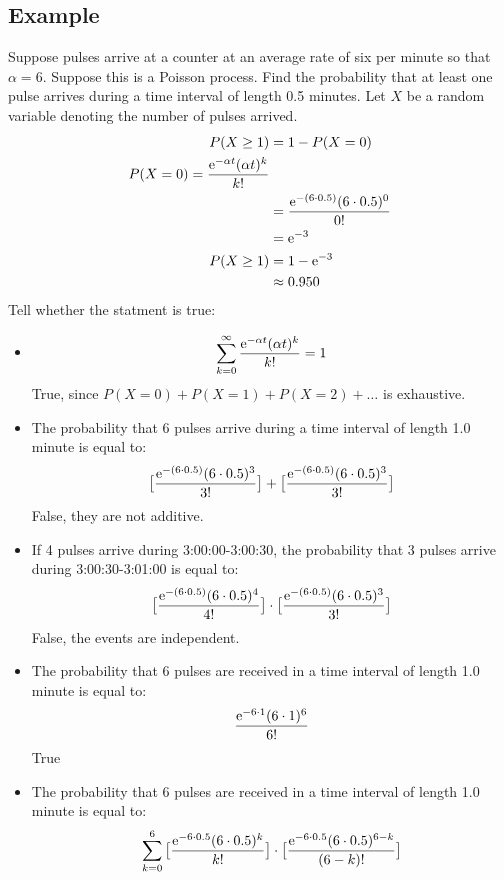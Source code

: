 \documentclass[letterpaper, 12pt]{math}
\begin{document}
\subsection*{Example}
Suppose pulses arrive at a counter at an average rate of six per minute so that
\( \alpha = 6 \). Suppose this is a Poisson process. Find the probability that
at least one pulse arrives during a time interval of length 0.5 minutes. Let
\( X \) be a random variable denoting the number of pulses arrived.
\begin{align*}
  P(X\geq 1) &= 1-P(X=0) \\
  P(X=0) = \frac{\mathrm{e}^{-\alpha t}(\alpha t)^{k}}{k!} \\
  &= \frac{\mathrm{e}^{-(6\cdot 0.5)}(6\cdot 0.5)^{0}}{0!} \\
  &= \mathrm{e}^{-3} \\
  P(X\geq 1) &= 1-\mathrm{e}^{-3} \\
  &\approx 0.950
\end{align*}
Tell whether the statment is true:
\begin{itemize}
  \item
    \[ \sum_{k=0}^{\infty}\frac{\mathrm{e}^{-\alpha t}(\alpha t)^{k}}{k!} = 1 \]
    True, since \( P(X=0)+P(X=1)+P(X=2)+\dots \) is exhaustive.
  \item The probability that 6 pulses arrive during a time interval of length
    1.0 minute is equal to:
    \[ \big[\frac{\mathrm{e}^{-(6\cdot 0.5)}(6\cdot 0.5)^{3}}{3!}\big] +
       \big[\frac{\mathrm{e}^{-(6\cdot 0.5)}(6\cdot 0.5)^{3}}{3!}\big] \]
    False, they are not additive.
  \item If 4 pulses arrive during 3:00:00-3:00:30, the probability that 3 pulses
    arrive during 3:00:30-3:01:00 is equal to:
    \[ \big[\frac{\mathrm{e}^{-(6\cdot 0.5)}(6\cdot 0.5)^{4}}{4!}\big]\cdot
       \big[\frac{\mathrm{e}^{-(6\cdot 0.5)}(6\cdot 0.5)^{3}}{3!}\big] \]
    False, the events are independent.
  \item The probability that 6 pulses are received in a time interval of
    length 1.0 minute is equal to:
    \[ \frac{\mathrm{e}^{-6\cdot 1}(6\cdot 1)^{6}}{6!} \]
    True
  \item The probability that 6 pulses are received in a time interval of
    length 1.0 minute is equal to:
    \[ \sum_{k=0}^{6}\big[\frac{\mathrm{e}^{-6\cdot 0.5}(6\cdot 0.5)^{k}}{k!}\big]\cdot
       \big[\frac{\mathrm{e}^{-6\cdot 0.5}(6\cdot 0.5)^{6-k}}{(6-k)!}\big] \]
\end{itemize}
\end{document}
